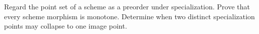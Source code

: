 \begin{problem}\label{chal:vi21-c02}
Regard the point set of a scheme as a preorder under specialization.  Prove that every scheme morphism is monotone.  Determine when two distinct specialization points may collapse to one image point.
\end{problem}
